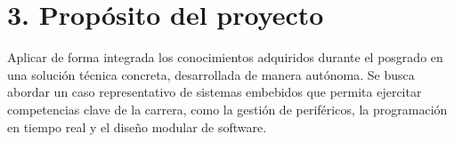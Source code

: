 \documentclass[
11pt, %
]{charter}
\begin{document}


 



\section{3. Propósito del proyecto}
\label{sec:proposito}

Aplicar de forma integrada los conocimientos adquiridos durante el posgrado en una solución técnica concreta, desarrollada de manera autónoma. Se busca abordar un caso representativo de sistemas embebidos que permita ejercitar competencias clave de la carrera, como la gestión de periféricos, la programación en tiempo real y el diseño modular de software. 



\end{document}
